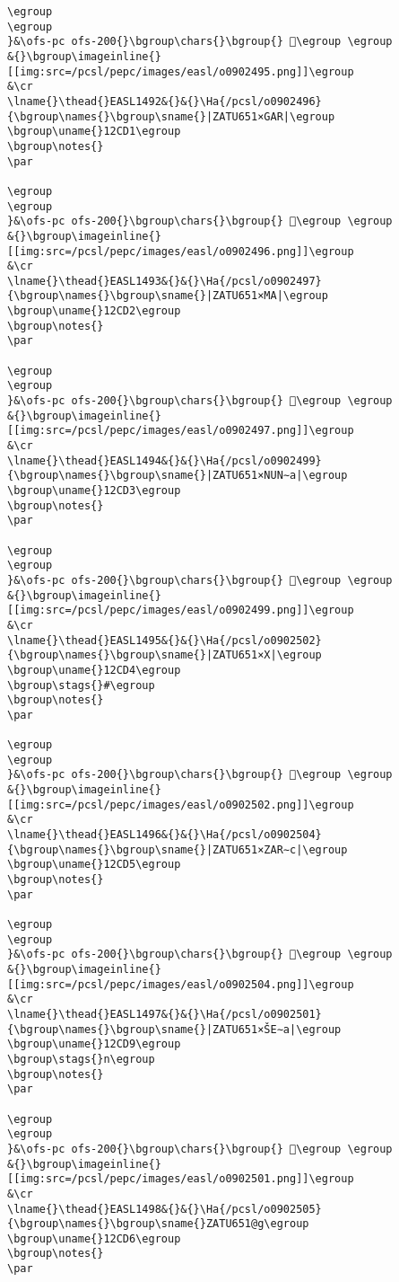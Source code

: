 \begin{verbatim}
\egroup
\egroup
}&\ofs-pc ofs-200{}\bgroup\chars{}\bgroup{} 𒳐\egroup \egroup
&{}\bgroup\imageinline{}[[img:src=/pcsl/pepc/images/easl/o0902495.png]]\egroup
&\cr
\lname{}\thead{}EASL1492&{}&{}\Ha{/pcsl/o0902496}{\bgroup\names{}\bgroup\sname{}|ZATU651×GAR|\egroup
\bgroup\uname{}12CD1\egroup
\bgroup\notes{}
\par 

\egroup
\egroup
}&\ofs-pc ofs-200{}\bgroup\chars{}\bgroup{} 𒳑\egroup \egroup
&{}\bgroup\imageinline{}[[img:src=/pcsl/pepc/images/easl/o0902496.png]]\egroup
&\cr
\lname{}\thead{}EASL1493&{}&{}\Ha{/pcsl/o0902497}{\bgroup\names{}\bgroup\sname{}|ZATU651×MA|\egroup
\bgroup\uname{}12CD2\egroup
\bgroup\notes{}
\par 

\egroup
\egroup
}&\ofs-pc ofs-200{}\bgroup\chars{}\bgroup{} 𒳒\egroup \egroup
&{}\bgroup\imageinline{}[[img:src=/pcsl/pepc/images/easl/o0902497.png]]\egroup
&\cr
\lname{}\thead{}EASL1494&{}&{}\Ha{/pcsl/o0902499}{\bgroup\names{}\bgroup\sname{}|ZATU651×NUN∼a|\egroup
\bgroup\uname{}12CD3\egroup
\bgroup\notes{}
\par 

\egroup
\egroup
}&\ofs-pc ofs-200{}\bgroup\chars{}\bgroup{} 𒳓\egroup \egroup
&{}\bgroup\imageinline{}[[img:src=/pcsl/pepc/images/easl/o0902499.png]]\egroup
&\cr
\lname{}\thead{}EASL1495&{}&{}\Ha{/pcsl/o0902502}{\bgroup\names{}\bgroup\sname{}|ZATU651×X|\egroup
\bgroup\uname{}12CD4\egroup
\bgroup\stags{}#\egroup
\bgroup\notes{}
\par 

\egroup
\egroup
}&\ofs-pc ofs-200{}\bgroup\chars{}\bgroup{} 𒳔\egroup \egroup
&{}\bgroup\imageinline{}[[img:src=/pcsl/pepc/images/easl/o0902502.png]]\egroup
&\cr
\lname{}\thead{}EASL1496&{}&{}\Ha{/pcsl/o0902504}{\bgroup\names{}\bgroup\sname{}|ZATU651×ZAR∼c|\egroup
\bgroup\uname{}12CD5\egroup
\bgroup\notes{}
\par 

\egroup
\egroup
}&\ofs-pc ofs-200{}\bgroup\chars{}\bgroup{} 𒳕\egroup \egroup
&{}\bgroup\imageinline{}[[img:src=/pcsl/pepc/images/easl/o0902504.png]]\egroup
&\cr
\lname{}\thead{}EASL1497&{}&{}\Ha{/pcsl/o0902501}{\bgroup\names{}\bgroup\sname{}|ZATU651×ŠE∼a|\egroup
\bgroup\uname{}12CD9\egroup
\bgroup\stags{}n\egroup
\bgroup\notes{}
\par 

\egroup
\egroup
}&\ofs-pc ofs-200{}\bgroup\chars{}\bgroup{} 𒳙\egroup \egroup
&{}\bgroup\imageinline{}[[img:src=/pcsl/pepc/images/easl/o0902501.png]]\egroup
&\cr
\lname{}\thead{}EASL1498&{}&{}\Ha{/pcsl/o0902505}{\bgroup\names{}\bgroup\sname{}ZATU651@g\egroup
\bgroup\uname{}12CD6\egroup
\bgroup\notes{}
\par 


\end{verbatim}
